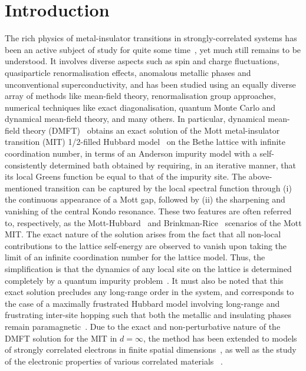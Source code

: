 \documentclass{iopart}
\begin{document}
\section{Introduction}

The rich physics of metal-insulator transitions in strongly-correlated systems has been an active subject of study for quite some time~\cite{Mott_RMP_1968,milligan_1985,imada1998metal}, yet much still remains to be understood. It involves diverse aspects such as spin and charge fluctuations, quasiparticle renormalisation effects, anomalous metallic phases and unconventional superconductivity, and has been studied using an equally diverse array of methods like mean-field theory, renormalisation group approaches, numerical techniques like exact diagonalisation, quantum Monte Carlo and dynamical mean-field theory, and many others. In particular, dynamical mean-field theory (DMFT)~\cite{kuramoto1987,Cox1988,metzner_volhardt_1989,zhang_1993,georges1996,parcollet_2004,maier_2005,kotliar_rmp_2006,ohashi_2008} obtains an exact solution of the Mott metal-insulator transition (MIT) 1/2-filled Hubbard model~\cite{Mott_1949,gutzwiller_1963,kanamori_1963,hubbard1963electron,brinkman_rice_1970} on the Bethe lattice with infinite coordination number, in terms of an Anderson impurity model with a self-consistently determined bath 
obtained by requiring, in an iterative manner, that its local Greens function be equal to that of the impurity site. The above-mentioned transition can be captured by the local spectral function through (i) the continuous appearance of a Mott gap, followed by (ii) the sharpening and vanishing of the central Kondo resonance. These two features are often referred to, respectively, as the Mott-Hubbard~\cite{hubbard1963electron} and Brinkman-Rice~\cite{brinkman_rice_1970} scenarios of the Mott MIT. The exact nature of the solution arises from the fact that all non-local contributions to the lattice self-energy are observed to vanish upon taking the limit of an infinite coordination number for the lattice model. 
Thus, the simplification is that the dynamics of any local site on the lattice is determined completely by a quantum impurity problem~\cite{georges1996,Logan_2016}.
It must also be noted that this exact solution precludes any long-range order in the system, and corresponds to the case of a maximally frustrated Hubbard model involving long-range and frustrating inter-site hopping such that both the metallic and insulating phases remain paramagnetic~\cite{vucicevic_2013}. Due to the exact and non-perturbative nature of the DMFT solution for the MIT in \(d=\infty\), the method has been extended to models of strongly correlated electrons in finite spatial dimensions~\cite{park2008,rohringer_2018,maier_2005}, as well as the study of the electronic properties of various correlated materials ~\cite{lichenstein_1998,kotliar_2006,held_2007_ldadmft}.
\end{document}
